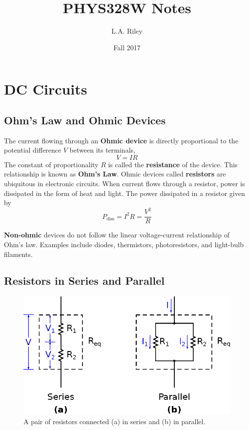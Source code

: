 \documentclass[11pt]{article}
\title{PHYS328W Notes} \author{L.A. Riley} \date{Fall 2017}
\begin{document}
\thispagestyle{empty}

\maketitle

\section{DC Circuits}

\subsection{Ohm's Law and Ohmic Devices}
\label{sec:ohm}

The current flowing through an \textbf{Ohmic device} is directly
proportional to the potential difference $V$ between its terminals,
\begin{equation}
  V=IR
\label{eq:Ohm}
\end{equation}
The constant of proportionality $R$ is called the \textbf{resistance}
of the device. This relationship is known as \textbf{Ohm's Law}. Ohmic
devices called \textbf{resistors} are ubiquitous in electronic
circuits. When current flows through a resistor, power is dissipated
in the form of heat and light. The power dissipated in a resistor
given by
\begin{equation}
  P_\mathrm{diss} = I^2 R = \frac{V^2}{R}
\end{equation}

\textbf{Non-ohmic} devices do not follow the linear voltage-current
relationship of Ohm's law. Examples include diodes, thermistors,
photoresistors, and light-bulb filaments.

\subsection{Resistors in Series and Parallel}
\label{sec:serpar}

\begin{figure}[ht]
  \begin{center}
    \includegraphics{seriesparallel.eps}
    \caption{A pair of resistors connected (a) in series and (b) in
      parallel.}
    \label{fig:seriesparallel}
  \end{center}
\end{figure}
\end{document}
